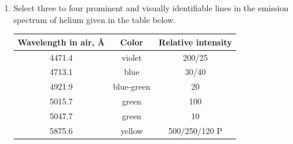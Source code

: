 \documentclass[12pt]{article}
\begin{document}
\begin{enumerate}
    \item Select three to four prominent and visually identifiable lines in the emission spectrum of helium given in the table below.
    \begin{table}[ht!]
    \centering
    \begin{tabular}{|c|c|c|}
    \hline
    Wavelength in air, \AA & Color & Relative intensity \\
    \hline
    4471.4 & violet & 200/25\\
    4713.1 & blue & 30/40\\
    4921.9 & blue-green & 20\\
    5015.7 & green &  100\\
    5047.7 & green & 10 \\
    5875.6 & yellow & 500/250/120 P\\

\end{tabular}
\end{table}
\end{enumerate}
\end{document}
